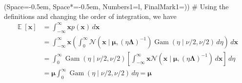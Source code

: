 \documentclass[12pt, a4paper]{article}
\newcommand{\listSpace}{-0.5em}%
\newcommand{\vect}[1]{\bm{#1}}
\DeclareMathOperator{\E}{\mathbb{E}}
\begin{document}
\begin{easylist}[enumerate]
	\ListProperties(Space=\listSpace, Space*=\listSpace, Numbers1=l, FinalMark1={)})
	# Using the definitions and changing the order of integration, we have
	\begin{align*}
		\E[\vect{x} ] &= \int_{-\infty}^{\infty} \vect{x}  p(\vect{x} ) \, d\vect{x}  \\
		&= \int_{-\infty}^{\infty} \vect{x} 
		\left( 
		\int_{0}^{\infty}
		\mathcal{N}\left(\vect{x} \mid \vect{\mu},  (\eta \vect{\Lambda})^{-1}\right)
		\operatorname{Gam}\left(\eta \mid \nu /2, \nu / 2\right )
		\, d \eta
		 \right) \, d\vect{x} \\
		&= 
		\int_{0}^{\infty}
		\operatorname{Gam}\left(\eta \mid \nu /2, \nu / 2\right )
		\left[ \int_{-\infty}^{\infty} \vect{x}
		\mathcal{N}\left(\vect{x} \mid \vect{\mu},  (\eta \vect{\Lambda})^{-1}\right)
		\, d\vect{x} \right] \, d \eta \\
		&= \vect{\mu}  \int_{0}^{\infty}
		\operatorname{Gam}\left(\eta \mid \nu /2, \nu / 2\right )
		 \, d \eta = \vect{\mu}
	\end{align*}
	

\end{easylist}
\end{document}
